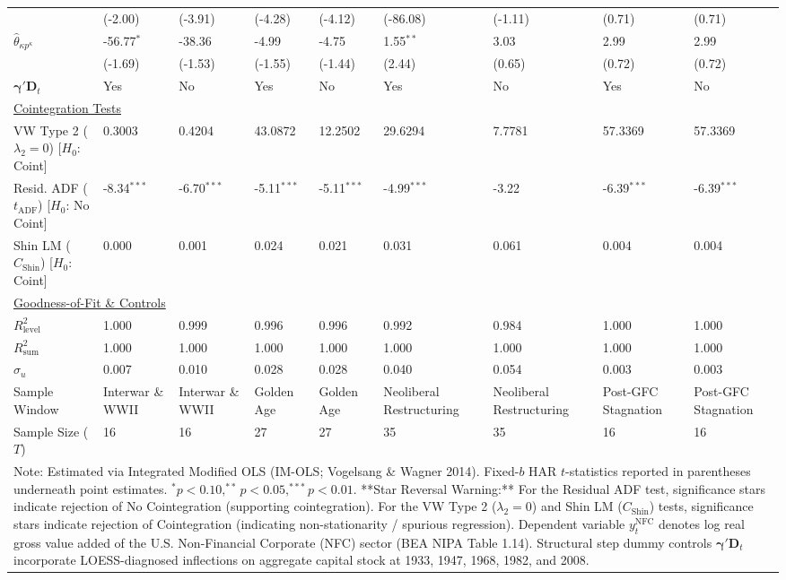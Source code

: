 \begin{landscape}
\begin{table}[H]
\begin{tabular}{p{5.0cm}p{1.5cm}p{1.5cm}p{1.5cm}p{1.5cm}p{1.5cm}p{1.5cm}p{1.5cm}p{1.5cm}}
 & {\scriptsize (-2.00)} & {\scriptsize (-3.91)} & {\scriptsize (-4.28)} & {\scriptsize (-4.12)} & {\scriptsize (-86.08)} & {\scriptsize (-1.11)} & {\scriptsize (0.71)} & {\scriptsize (0.71)}  \\
$\hat{\theta}_{\kappa p^{\kappa}}$ & -56.77$^{*}$ & -38.36 & -4.99 & -4.75 & 1.55$^{**}$ & 3.03 & 2.99 & 2.99  \\
 & {\scriptsize (-1.69)} & {\scriptsize (-1.53)} & {\scriptsize (-1.55)} & {\scriptsize (-1.44)} & {\scriptsize (2.44)} & {\scriptsize (0.65)} & {\scriptsize (0.72)} & {\scriptsize (0.72)}  \\
$\boldsymbol{\gamma}' \mathbf{D}_t$ & Yes & No & Yes & No & Yes & No & Yes & No  \\
\midrule
\multicolumn{9}{l}{\underline{Cointegration Tests}} \\
VW Type 2 ($\lambda_2 = 0$) [$H_0$: Coint] & 0.3003 & 0.4204 & 43.0872 & 12.2502 & 29.6294 & 7.7781 & 57.3369 & 57.3369  \\
Resid. ADF ($t_{\text{ADF}}$) [$H_0$: No Coint] & -8.34$^{***}$ & -6.70$^{***}$ & -5.11$^{***}$ & -5.11$^{***}$ & -4.99$^{***}$ & -3.22 & -6.39$^{***}$ & -6.39$^{***}$  \\
Shin LM ($C_{\text{Shin}}$) [$H_0$: Coint] & 0.000 & 0.001 & 0.024 & 0.021 & 0.031 & 0.061 & 0.004 & 0.004  \\
\midrule
\multicolumn{9}{l}{\underline{Goodness-of-Fit \& Controls}} \\
$R_{\text{level}}^2$ & 1.000 & 0.999 & 0.996 & 0.996 & 0.992 & 0.984 & 1.000 & 1.000  \\
$R_{\text{sum}}^2$ & 1.000 & 1.000 & 1.000 & 1.000 & 1.000 & 1.000 & 1.000 & 1.000  \\
$\hat{\sigma}_u$ & 0.007 & 0.010 & 0.028 & 0.028 & 0.040 & 0.054 & 0.003 & 0.003  \\
Sample Window & Interwar \& WWII & Interwar \& WWII & Golden Age & Golden Age & Neoliberal Restructuring & Neoliberal Restructuring & Post-GFC Stagnation & Post-GFC Stagnation  \\
Sample Size ($T$) & 16 & 16 & 27 & 27 & 35 & 35 & 16 & 16  \\
\bottomrule
\multicolumn{9}{p{19.5cm}}{\footnotesize Note: Estimated via Integrated Modified OLS (IM-OLS; Vogelsang \& Wagner 2014). Fixed-$b$ HAR $t$-statistics reported in parentheses underneath point estimates. $^*p<0.10, ^{**}p<0.05, ^{***}p<0.01$. **Star Reversal Warning:** For the Residual ADF test, significance stars indicate rejection of No Cointegration (supporting cointegration). For the VW Type 2 ($\lambda_2 = 0$) and Shin LM ($C_{\text{Shin}}$) tests, significance stars indicate rejection of Cointegration (indicating non-stationarity / spurious regression). Dependent variable $y_t^{\text{NFC}}$ denotes log real gross value added of the U.S. Non-Financial Corporate (NFC) sector (BEA NIPA Table 1.14). Structural step dummy controls $\boldsymbol{\gamma}' \mathbf{D}_t$ incorporate LOESS-diagnosed inflections on aggregate capital stock at 1933, 1947, 1968, 1982, and 2008.}
\end{tabular}
\end{table}
\end{landscape}
